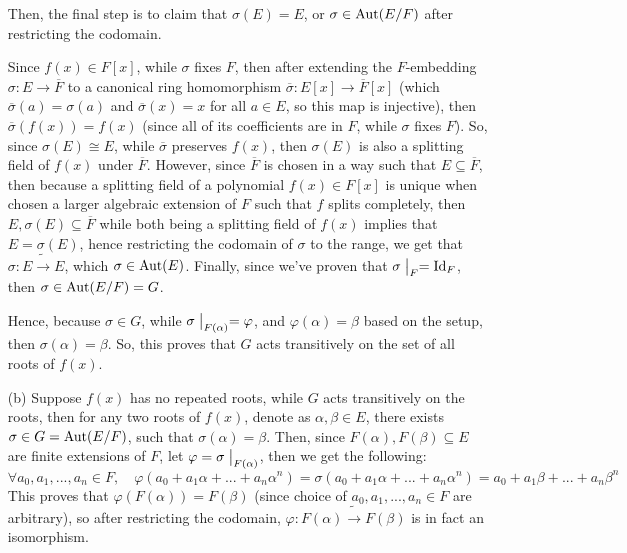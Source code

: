 \documentclass{article}
\begin{document}
\begin{itemize}
    Then, the final step is to claim that $\sigma(E)=E$, or $\sigma\in \textmd{Aut}(E/F)$ after restricting the codomain.

    Since $f(x)\in F[x]$, while $\sigma$ fixes $F$, then after extending the $F$-embedding $\sigma:E\rightarrow\overline{F}$ to a canonical ring homomorphism $\overline{\sigma}:E[x]\rightarrow\overline{F}[x]$ (which $\overline{\sigma}(a)=\sigma(a)$ and $\overline{\sigma}(x)=x$ for all $a\in E$, so this map is injective), then $\overline{\sigma}(f(x)) = f(x)$ (since all of its coefficients are in $F$, while $\sigma$ fixes $F$). So, since $\sigma(E)\cong E$, while $\overline{\sigma}$ preserves $f(x)$, then $\sigma(E)$ is also a splitting field of $f(x)$ under $\overline{F}$. However, since $\overline{F}$ is chosen in a way such that $E\subseteq \overline{F}$, then because a splitting field of a polynomial $f(x)\in F[x]$ is unique when chosen a larger algebraic extension of $F$ such that $f$ splits completely, then $E,\sigma(E)\subseteq \overline{F}$ while both being a splitting field of $f(x)$ implies that $E=\sigma(E)$, hence restricting the codomain of $\sigma$ to the range, we get that $\sigma:E\tilde{\rightarrow} E$, which $\sigma\in \textmd{Aut}(E)$. Finally, since we've proven that $\sigma\bigm|_F = \textmd{Id}_F$, then $\sigma\in \textmd{Aut}(E/F) = G$.

    Hence, because $\sigma\in G$, while $\sigma\bigm|_{F(\alpha)}=\varphi$, and $\varphi(\alpha)=\beta$ based on the setup, then $\sigma(\alpha)=\beta$. So, this proves that $G$ acts transitively on the set of all roots of $f(x)$.

    \hfil

    \item[(b)] Suppose $f(x)$ has no repeated roots, while $G$ acts transitively on the roots, then for any two roots of $f(x)$, denote as $\alpha,\beta \in E$, there exists $\sigma\in G=\textmd{Aut}(E/F)$, such that $\sigma(\alpha)=\beta$. Then, since $F(\alpha),F(\beta)\subseteq E$ are finite extensions of $F$, let $\varphi=\sigma\bigm|_{F(\alpha)}$, then we get the following:
    $$\forall a_0,a_1,...,a_n\in F,\quad \varphi(a_0+a_1\alpha+...+a_n\alpha^n) = \sigma(a_0+a_1\alpha+...+a_n\alpha^n) = a_0+a_1\beta + ... + a_n\beta^n$$
    This proves that $\varphi(F(\alpha))=F(\beta)$ (since choice of $a_0,a_1,...,a_n\in F$ are arbitrary), so after restricting the codomain, $\varphi:F(\alpha)\tilde{\rightarrow}F(\beta)$ is in fact an isomorphism.


\end{itemize}
\end{document}
